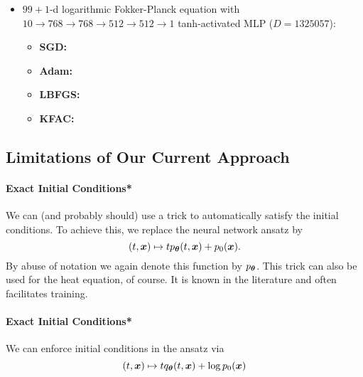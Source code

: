 \begin{itemize}
\item $99+1$-d logarithmic Fokker-Planck equation with $10 \to 768 \to 768 \to 512 \to 512 \to 1$ tanh-activated MLP ($D=\num{1325057}$):
  \begin{itemize}
    \def\pathToRuns{kfac_pinns_exp/exp45_log_fokker_planck99d_isotropic_gaussian_random/tex}
  \item \textbf{SGD:} 
  \item \textbf{Adam:} 
  \item \textbf{LBFGS:} 
  \item \textbf{KFAC:} 
  \end{itemize}
\end{itemize}

\subsection{Limitations of Our Current Approach}

\paragraph{Exact Initial Conditions*}
We can (and probably should) use a trick to automatically satisfy the initial conditions. To achieve this, we replace the neural network ansatz by
\begin{equation}
  (t,{\bm{x}})
  \mapsto
  t p_{\bm{\theta}}(t,{\bm{x}}) + p_0({\bm{x}}).
\end{equation}
By abuse of notation we again denote this function by $p_{\bm{\theta}}$. This trick can also be used for the heat equation, of course. It is known in the literature and often facilitates training. 

\paragraph{Exact Initial Conditions*}
We can enforce initial conditions in the ansatz via
\begin{equation*}
  (t,{\bm{x}}) \mapsto t q_{\bm{\theta}}(t, {\bm{x}}) + \log p_0({\bm{x}})
\end{equation*}


